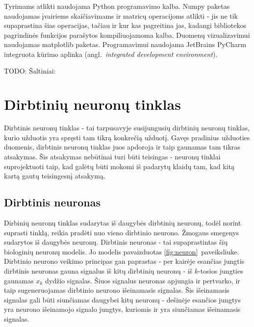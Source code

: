 \documentclass{VUMIFPSbakalaurinis}
\newcommand{\TODO}[1]{
\colorbox{todo-background-color}{TODO: #1}
}
\begin{document}
Tyrimams atlikti naudojama Python programavimo kalba.
Numpy paketas naudojamas įvairiems skaičiavimams ir matricų operacijoms atlikti - jis ne tik supaprastina šias operacijas, tačiau ir kur kas pagreitina jas, kadangi bibliotekos pagrindinės funkcijos parašytos kompiliuojamoma kalba.
Duomenų vizualizavimui naudojamas matplotlib paketas.
Programavimui naudojama JetBrains PyCharm integruota kūrimo aplinka (angl.~\textit{integrated development environment}).


\TODO{Šaltiniai:}

\cite{298007}



\section{Dirbtinių neuronų tinklas}

Dirbtinis neuronų tinklas - tai tarpusavyje susijungusių dirbtinių neuronų tinklas, kurio užduotis yra spręsti tam tikrą konkrečią užduotį.
Gavęs pradinius užduoties duomenis, dirbtinis neuronų tinklas juos apdoroja ir taip gaunamas tam tikras atsakymas.
Šis atsakymas nebūtinai turi būti teisingas - neuronų tinklai suprojektuoti taip, kad galėtų būti mokomi iš padarytų klaidų tam, kad kitą kartą gautų teisingesnį atsakymą.

\subsection{Dirbtinis neuronas}

Dirbinių neuronų tinklas sudarytas iš daugybės dirbtinių neuronų, todėl norint suprasti tinklą, reikia pradėti nuo vieno dirbtinio neurono.
Žmogaus smegenys sudarytos iš daugybės neuronų.
Dirbtinis neuronas - tai supaprastintas šių biologinių neuronų modelis.
Jo modelis pavaizduotas \ref{fig:neuron}~paveiksliuke.
Dirbtinio neurono veikimo principas gan paprastas - per kairėje esančias jungtis dirbtinis neuronas gauna signalus iš kitų dirbtinių neuronų - iš $k$-tosios jungties gaunamas $x_k$ dydžio signalas.
Šiuos signalus neuronas apjungia ir pertvarko, ir taip sugeneruojamas dirbtinio neurono išeinamasis signalas.
Šis išeinamasis signalas gali būti siunčiamas daugybei kitų neuronų - dešinėje esančios jungtys yra neurono išeinamojo signalo jungtys, kuriomis ir yra siunčiamas išeinamasis signalas.
\end{document}
